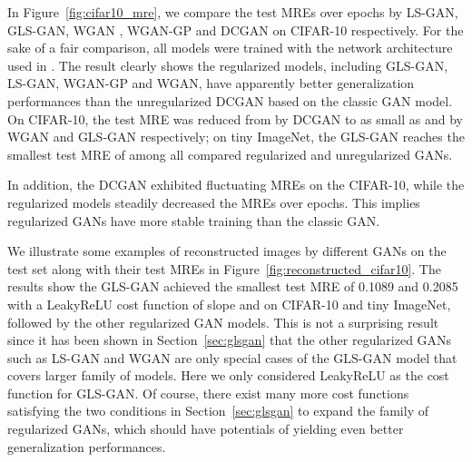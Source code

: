 \documentclass[11pt,fullpage, letterpaper,twoside]{article}
\newcommand{\1}[1]{\mathds{1}_{\left[#1\right]}}
\begin{document}
In Figure~\ref{fig:cifar10_mre}, we compare the test MREs over  epochs by LS-GAN, GLS-GAN, WGAN \cite{wgan17}, WGAN-GP \cite{gulrajani2017improved} and DCGAN \cite{radford2015unsupervised} on CIFAR-10 respectively.
For the sake of a fair comparison, all models were trained with the network architecture used in \cite{radford2015unsupervised}.
The result clearly shows the regularized models, including GLS-GAN, LS-GAN, WGAN-GP and WGAN, have apparently better generalization performances than the unregularized DCGAN based on the classic GAN model. On CIFAR-10, the test MRE was reduced from  by DCGAN to as small as  and  by WGAN and GLS-GAN respectively; on tiny ImageNet, the GLS-GAN reaches the smallest test MRE of  among all compared regularized and unregularized GANs.



In addition, the DCGAN exhibited fluctuating MREs on the CIFAR-10, while the regularized models steadily decreased the MREs over epochs. This implies regularized GANs have more stable training than the classic GAN. 






We illustrate some examples of reconstructed images by different GANs on the test set along with their test MREs in Figure~\ref{fig:reconstructed_cifar10}.
The results show the GLS-GAN achieved the smallest test MRE of 0.1089 and 0.2085 with a LeakyReLU cost function of slope  and  on CIFAR-10 and tiny ImageNet, followed by the other regularized GAN models.
This is not a surprising result since it has been shown in Section~\ref{sec:glsgan} that the other regularized GANs such as LS-GAN and WGAN are only special cases of the GLS-GAN model that covers larger family of models. Here we only considered LeakyReLU as the cost function for GLS-GAN. Of course, there exist many more cost functions satisfying the two conditions in Section~\ref{sec:glsgan}  to expand the family of regularized GANs, which should have potentials of yielding even better generalization performances.
\end{document}
